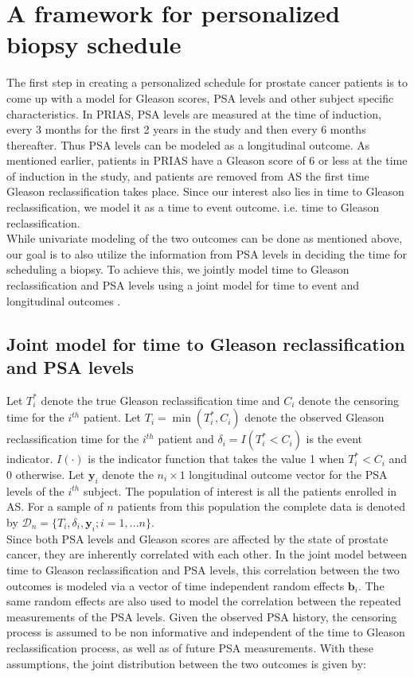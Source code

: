 
\section{A framework for personalized biopsy schedule}
\label{sec : jm_introduction}
The first step in creating a personalized schedule for prostate cancer patients is to come up with a model for Gleason scores, PSA levels and other subject specific characteristics. In PRIAS, PSA levels are measured at the time of induction, every 3 months for the first 2 years in the study and then every 6 months thereafter. Thus PSA levels can be modeled as a longitudinal outcome. As mentioned earlier, patients in PRIAS have a Gleason score of 6 or less at the time of induction in the study, and patients are removed from AS the first time Gleason reclassification takes place. Since our interest also lies in time to Gleason reclassification, we model it as a time to event outcome. i.e. time to Gleason reclassification. \\

While univariate modeling of the two outcomes can be done as mentioned above, our goal is to also utilize the information from PSA levels in deciding the time for scheduling a biopsy. To achieve this, we jointly model time to Gleason reclassification and PSA levels using a joint model for time to event and longitudinal outcomes \cite{rizopoulos2012joint}. 

\subsection{Joint model for time to Gleason reclassification and PSA levels}
Let $T_i^*$ denote the true Gleason reclassification time and $C_i$ denote the censoring time for the $i^{th}$ patient. Let $T_i = \min(T_i^*, C_i)$ denote the observed Gleason reclassification time for the $i^{th}$ patient and $\delta_i = I(T_i^* < C_i)$ is the event indicator. $I(\cdot)$ is the indicator function that takes the value 1 when $T_i^* < C_i$ and 0 otherwise. Let $\boldsymbol{y}_i$ denote the $n_i \times 1$ longitudinal outcome vector for the PSA levels of the $i^{th}$ subject. The population of interest is all the patients enrolled in AS. For a sample of $n$ patients from this population the complete data is denoted by $\mathcal{D}_n = \{T_i, \delta_i, \boldsymbol{y}_i; i = 1,...n\}$.\\

Since both PSA levels and Gleason scores are affected by the state of prostate cancer, they are inherently correlated with each other. In the joint model between time to Gleason reclassification and PSA levels, this correlation between the two outcomes is modeled via a vector of time independent random effects $\boldsymbol{b}_i$. The same random effects are also used to model the correlation between the repeated measurements of the PSA levels. Given the observed PSA history, the censoring process is assumed to be non informative and independent of the time to Gleason reclassification process, as well as of future PSA measurements. With these assumptions, the joint distribution between the two outcomes is given by:

